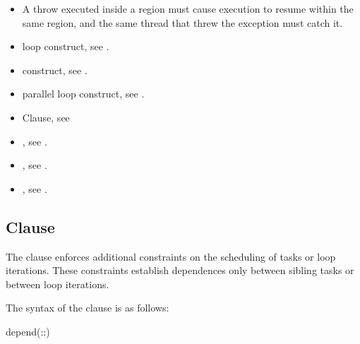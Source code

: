 \begin{cppspecific}
\begin{itemize}
\item A throw executed inside a  region must cause execution to
resume within the same  region, and the same thread that threw
the exception must catch it.
\end{itemize}
\end{cppspecific}



\crossreferences
\begin{itemize}
\item loop construct, see
.

\item {} construct, see
.

\item parallel loop construct, see
.

\item {} Clause, see

\item {}, see
.

\item {}, see
.

\item {}, see
.

\end{itemize}


\subsection{ Clause}
\label{subsec:depend Clause}
\summary
The  clause enforces additional constraints on the scheduling of tasks or loop iterations.  These
constraints establish dependences only between sibling tasks or between loop iterations.

\syntax
The syntax of the  clause is as follows:

\begin{ompSyntax}
depend(\plc{[depend-modifier}:\plc{]dependence-type }:)
\end{ompSyntax}

